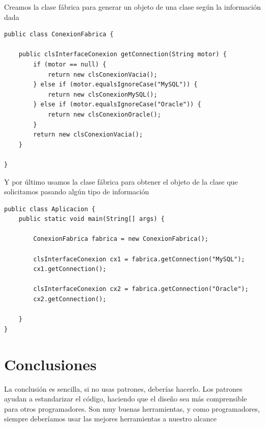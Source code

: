 \documentclass[twoside,twocolumn]{article}
\begin{document}
Creamos la clase fábrica para generar un objeto de una clase según la información dada
\lstset{breaklines=true,style=sharpc}
\begin{lstlisting}
public class ConexionFabrica {

    public clsInterfaceConexion getConnection(String motor) {
        if (motor == null) {
            return new clsConexionVacia();
        } else if (motor.equalsIgnoreCase("MySQL")) {
            return new clsConexionMySQL();
        } else if (motor.equalsIgnoreCase("Oracle")) {
            return new clsConexionOracle();
        }
        return new clsConexionVacia();
    }

}
\end{lstlisting}



Y por último usamos la clase fábrica para obtener el objeto de la clase que solicitamos pasando algún tipo de información
\lstset{breaklines=true,style=sharpc}
\begin{lstlisting}
public class Aplicacion {
    public static void main(String[] args) {

        ConexionFabrica fabrica = new ConexionFabrica();

        clsInterfaceConexion cx1 = fabrica.getConnection("MySQL");
        cx1.getConnection();

        clsInterfaceConexion cx2 = fabrica.getConnection("Oracle");
        cx2.getConnection();

    }
}
\end{lstlisting}





\section{Conclusiones}

La conclusión es sencilla, si no usas patrones, deberías hacerlo. Los patrones ayudan a estandarizar el código, haciendo que el diseño sea más comprensible para otros programadores. Son muy buenas herramientas, y como programadores, siempre deberíamos usar las mejores herramientas a nuestro alcance

\end{document}
